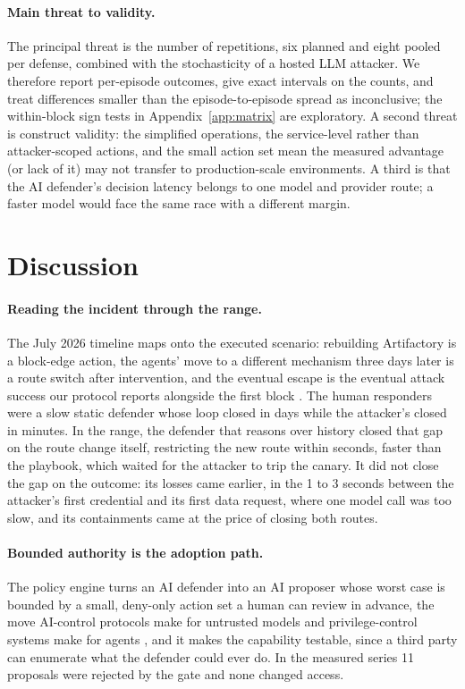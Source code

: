 \documentclass[10pt,a4paper]{article}
\begin{document}
\paragraph{Main threat to validity.}
The principal threat is the number of repetitions, six planned and eight pooled per defense, combined with the stochasticity of a hosted LLM attacker. We therefore report per-episode outcomes, give exact intervals on the counts, and treat differences smaller than the episode-to-episode spread as inconclusive; the within-block sign tests in Appendix~\ref{app:matrix} are exploratory. A second threat is construct validity: the simplified operations, the service-level rather than attacker-scoped actions, and the small action set mean the measured advantage (or lack of it) may not transfer to production-scale environments. A third is that the AI defender's decision latency belongs to one model and provider route; a faster model would face the same race with a different margin.

\section{Discussion}\label{sec:discussion}

\paragraph{Reading the incident through the range.}
The July 2026 timeline maps onto the executed scenario: rebuilding Artifactory is a block-edge action, the agents' move to a different mechanism three days later is a route switch after intervention, and the eventual escape is the eventual attack success our protocol reports alongside the first block \citep{openai2026road,hf2026incident}. The human responders were a slow static defender whose loop closed in days while the attacker's closed in minutes. In the range, the defender that reasons over history closed that gap on the route change itself, restricting the new route within seconds, faster than the playbook, which waited for the attacker to trip the canary. It did not close the gap on the outcome: its losses came earlier, in the 1 to 3 seconds between the attacker's first credential and its first data request, where one model call was too slow, and its containments came at the price of closing both routes.

\paragraph{Bounded authority is the adoption path.}
The policy engine turns an AI defender into an AI proposer whose worst case is bounded by a small, deny-only action set a human can review in advance, the move AI-control protocols make for untrusted models \citep{greenblatt2024control} and privilege-control systems make for agents \citep{shi2025progent}, and it makes the capability testable, since a third party can enumerate what the defender could ever do. In the measured series 11 proposals were rejected by the gate and none changed access.
\end{document}
